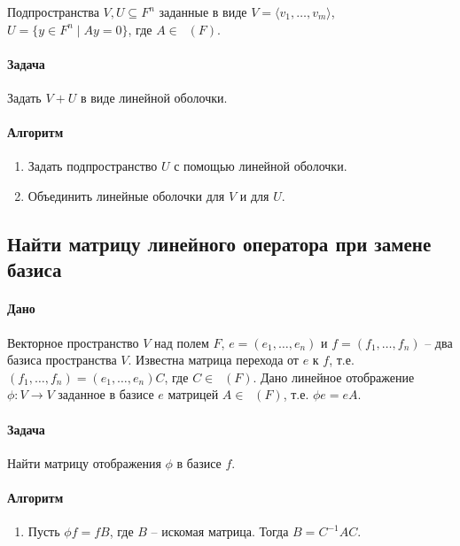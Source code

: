 \documentclass{article}
\newcommand{\MatrixDim}[3]{\mathop{\mathrm{M}_{#2\,#3}}(#1)}
\newcommand{\Matrix}[2]{\mathop{\mathrm{M}_{#2}}(#1)}
\begin{document}
Подпространства $V,U\subseteq F^{n}$ заданные в виде $V =\langle v_1,\ldots,v_m\rangle$, $U = \{y\in F^{n}\mid Ay = 0\}$, где $A\in \MatrixDim{F}{k}{n}$.

\paragraph{Задача}

Задать $V + U$ в виде линейной оболочки.

\paragraph{Алгоритм}
\begin{enumerate}
\item Задать подпространство $U$ с помощью линейной оболочки.

\item Объединить линейные оболочки для $V$ и для $U$.
\end{enumerate}



\subsection{Найти матрицу линейного оператора при замене базиса}

\paragraph{Дано} Векторное пространство $V$ над полем $F$, $e=(e_1,\ldots,e_n)$ и $f = (f_1,\ldots,f_n)$ -- два базиса пространства $V$. Известна матрица перехода от $e$ к $f$, т.е. $(f_1,\ldots,f_n) = (e_1,\ldots,e_n)C$, где $C\in \Matrix{F}{n}$. Дано линейное отображение $\phi\colon V\to V$ заданное в базисе $e$ матрицей $A\in\Matrix{F}{n}$, т.е. $\phi e = e A$.

\paragraph{Задача} Найти матрицу отображения $\phi$ в базисе $f$.

\paragraph{Алгоритм}
\begin{enumerate}
\item Пусть $\phi f = f B$, где $B$ -- искомая матрица. Тогда $B = C^{-1} A C$.
\end{enumerate}
\end{document}
